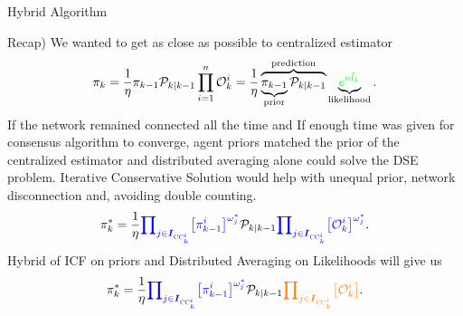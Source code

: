 \documentclass{beamer}
\newcommand{\bIs}[1]{\boldsymbol{I}_{#1}}  %
\theoremstyle{remark}
\newcommand{\suf}[1]{\textsc{\tiny #1}}  %
\begin{document}
\begin{frame}{Hybrid Algorithm}
	
{\color{red} Recap)}
We wanted to get as close as possible to centralized estimator
	{\color{blue}
		\begin{equation*}
		{\pi}_{k}  = \frac{1}{\eta} {{\pi}_{k-1}}
			\mathcal{P}_{k \vert k-1}  
		\prod_{i=1}^{n} \mathcal{O}_k^i
		= \frac{1}{\eta}\overbrace{ \underbrace{{\pi}_{k-1}}_{\text{prior}} 
			\mathcal{P}_{k \vert k-1}  
		}^{\text{prediction}}\underbrace{{\color{green}e^{n\tilde{l}_k}}}_{\text{likelihood}}.
		\end{equation*}}
{\color{red} If} the network remained connected all the time and {\color{red} If} enough time was given for consensus algorithm to converge, agent priors matched the prior of the centralized estimator  and distributed averaging {\color{red}alone} could solve the DSE problem.
{\color{red} Iterative Conservative Solution} would help with unequal prior, network disconnection and, avoiding double counting.
\begin{equation*}
 	{\pi}_{k}^*=	
	\frac{1}{\eta} 
	{\color{blue}{\prod\nolimits_{j \in \bIs{\suf{CC}^i_k} } }  
	\big[{\pi}^i_{k-1}\big]^{\omega_{j}^*}}
		\mathcal{P}_{k \vert k-1}
		{\color{blue}{\prod\nolimits_{j \in \bIs{\suf{CC}^i_k} } }\big[\mathcal{O}_k^i\big]^{\omega_{j}^*}		
		}.
\end{equation*}
Hybrid of {\color{blue}ICF on priors} and {\color{orange} Distributed Averaging on Likelihoods} will give us
\begin{equation*}
{\pi}_{k}^*=	
\frac{1}{\eta} 
{\color{blue}{\prod\nolimits_{j \in \bIs{\suf{CC}^i_k} } }  
	\big[{\pi}^i_{k-1}\big]^{\omega_{j}^*}}
	\mathcal{P}_{k \vert k-1}
	{\color{orange}{\prod\nolimits_{j \in \bIs{\suf{CC}^i_k} } }\big[\mathcal{O}_k^i\big]}		.
\end{equation*}
\end{frame}
\end{document}
